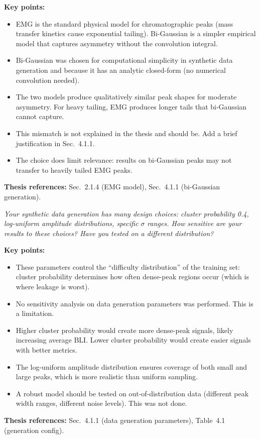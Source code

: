 \documentclass[11pt, letterpaper]{article}
\newcounter{qcounter}
\newcommand{\question}[1]{%
  \stepcounter{qcounter}%
  \begin{questionbox}[Q\theqcounter]%
    \itshape #1%
  \end{questionbox}%
}
\begin{document}
\begin{answerbox}
\textbf{Key points:}
\begin{itemize}[nosep]
  \item EMG is the standard physical model for chromatographic peaks
        (mass transfer kinetics cause exponential tailing).
        Bi-Gaussian is a simpler empirical model that captures
        asymmetry without the convolution integral.
  \item Bi-Gaussian was chosen for computational simplicity in
        synthetic data generation and because it has an analytic
        closed-form (no numerical convolution needed).
  \item The two models produce qualitatively similar peak shapes
        for moderate asymmetry.  For heavy tailing, EMG produces
        longer tails that bi-Gaussian cannot capture.
  \item This mismatch is not explained in the thesis and should be.
        Add a brief justification in Sec.~4.1.1.
  \item The choice does limit relevance: results on bi-Gaussian
        peaks may not transfer to heavily tailed EMG peaks.
\end{itemize}
\textbf{Thesis references:} Sec.~2.1.4 (EMG model), Sec.~4.1.1 (bi-Gaussian generation).
\end{answerbox}

\question{Your synthetic data generation has many design choices: cluster
probability 0.4, log-uniform amplitude distributions, specific
$\sigma$ ranges.  How sensitive are your results to these choices?
Have you tested on a different distribution?}

\begin{answerbox}
\textbf{Key points:}
\begin{itemize}[nosep]
  \item These parameters control the ``difficulty distribution'' of
        the training set: cluster probability determines how often
        dense-peak regions occur (which is where leakage is worst).
  \item No sensitivity analysis on data generation parameters was
        performed.  This is a limitation.
  \item Higher cluster probability would create more dense-peak
        signals, likely increasing average BLI.  Lower cluster
        probability would create easier signals with better metrics.
  \item The log-uniform amplitude distribution ensures coverage of
        both small and large peaks, which is more realistic than
        uniform sampling.
  \item A robust model should be tested on out-of-distribution
        data (different peak width ranges, different noise levels).
        This was not done.
\end{itemize}
\textbf{Thesis references:} Sec.~4.1.1 (data generation parameters), Table~4.1 (generation config).
\end{answerbox}
\end{document}
